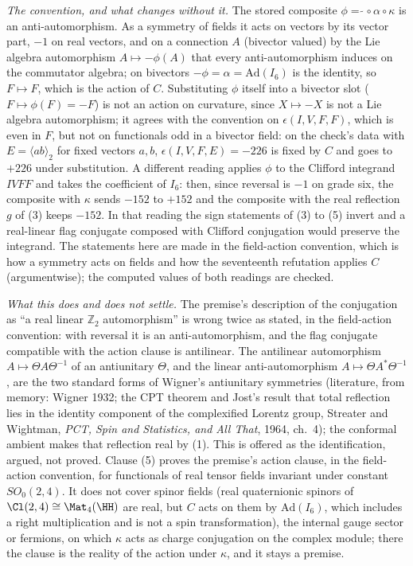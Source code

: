 \emph{The convention, and what changes without it.} The stored composite $\phi = \widetilde{\ }\circ\alpha\circ\kappa$ is an anti-automorphism. As a symmetry of fields it acts on vectors by its vector part, $-1$ on real vectors, and on a connection $A$ (bivector valued) by the Lie algebra automorphism $A \mapsto -\phi(A)$ that every anti-automorphism induces on the commutator algebra; on bivectors $-\phi = \alpha = \mathrm{Ad}(I_6)$ is the identity, so $F \mapsto F$, which is the action of $C$. Substituting $\phi$ itself into a bivector slot ($F \mapsto \phi(F) = -F$) is not an action on curvature, since $X \mapsto -X$ is not a Lie algebra automorphism; it agrees with the convention on $\epsilon(I,V,F,F)$, which is even in $F$, but not on functionals odd in a bivector field: on the check's data with $E = \langle ab\rangle_2$ for fixed vectors $a, b$, $\epsilon(I,V,F,E) = -226$ is fixed by $C$ and goes to $+226$ under substitution. A different reading applies $\phi$ to the Clifford integrand $IVFF$ and takes the coefficient of $I_6$: then, since reversal is $-1$ on grade six, the composite with $\kappa$ sends $-152$ to $+152$ and the composite with the real reflection $g$ of (3) keeps $-152$. In that reading the sign statements of (3) to (5) invert and a real-linear flag conjugate composed with Clifford conjugation would preserve the integrand. The statements here are made in the field-action convention, which is how a symmetry acts on fields and how the seventeenth refutation applies $C$ (argumentwise); the computed values of both readings are checked.

\emph{What this does and does not settle.} The premise's description of the conjugation as ``a real linear $\mathbb{Z}_2$ automorphism'' is wrong twice as stated, in the field-action convention: with reversal it is an anti-automorphism, and the flag conjugate compatible with the action clause is antilinear. The antilinear automorphism $A \mapsto \Theta A \Theta^{-1}$ of an antiunitary $\Theta$, and the linear anti-automorphism $A \mapsto \Theta A^{*}\Theta^{-1}$, are the two standard forms of Wigner's antiunitary symmetries (literature, from memory: Wigner 1932; the CPT theorem and Jost's result that total reflection lies in the identity component of the complexified Lorentz group, Streater and Wightman, \emph{PCT, Spin and Statistics, and All That}, 1964, ch.~4); the conformal ambient makes that reflection real by (1). This is offered as the identification, argued, not proved. Clause (5) proves the premise's action clause, in the field-action convention, for functionals of real tensor fields invariant under constant $SO_0(2,4)$. It does not cover spinor fields (real quaternionic spinors of $\Cl(2,4) \cong \Mat_4(\HH)$ are real, but $C$ acts on them by $\mathrm{Ad}(I_6)$, which includes a right multiplication and is not a spin transformation), the internal gauge sector or fermions, on which $\kappa$ acts as charge conjugation on the complex module; there the clause is the reality of the action under $\kappa$, and it stays a premise.
